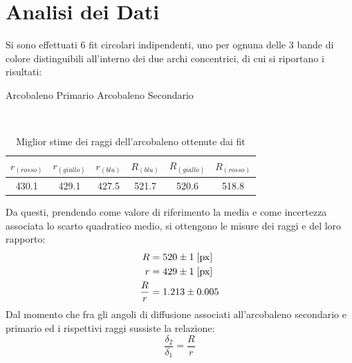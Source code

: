\documentclass{report}[a4paper,11pt]
\begin{document}
\section{Analisi dei Dati}
Si sono effettuati $6$ fit circolari indipendenti, uno per ognuna delle $3$ bande di colore distinguibili all'interno dei due archi concentrici, di cui si riportano i risultati:\\
\begin{table}[!htb]
  \begin{center}
  \begin{large}
  Arcobaleno Primario \qquad  Arcobaleno Secondario
  \end{large}\\
	\begin{tabular}{ccc|ccc}
	\toprule
	$r_{(rosso)}$  & $r_{(giallo)}$  & $r_{(blu)}$ & $R_{(blu)}$  & $R_{(giallo)}$  & $R_{(rosso)}$ \\
	\midrule
	\midrule
	 430.1 & 429.1 & 427.5 & 521.7 & 520.6 & 518.8 \\ 
	\bottomrule
	\end{tabular}
  \end{center}
  \caption{Miglior stime dei raggi dell'arcobaleno ottenute dai fit\label{tab:arcfit}}
\end{table}
Da questi, prendendo come valore di riferimento la media e come incertezza associata lo scarto quadratico medio, si ottengono le misure dei raggi e del loro rapporto:
\begin{align}\label{aln: bowrad}
R &= 520 \pm 1 \; [\rm px] \\
r &= 429 \pm 1 \; [\rm px] \\
\frac{R}{r} &= 1.213 \pm 0.005
\end{align}
Dal momento che fra gli angoli di diffusione associati all’arcobaleno secondario e primario ed i rispettivi raggi sussiste la relazione:
\begin{equation}\label{eq:ratio}
\frac{\delta_2}{\delta_1} = \frac{R}{r}
\end{equation}
\end{document}
